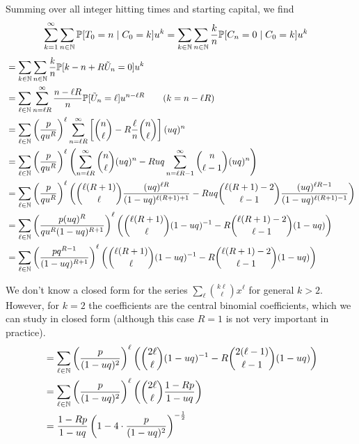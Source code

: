Summing over all integer hitting times and starting capital, we find
\begin{align*}
  \sum_{k=1}^\infty\sum_{n\in\mathbb{N}} \mathbb{P}[T_0 = n\mid C_0=k]u^k &= \sum_{k\in\mathbb{N}}\sum_{n\in\mathbb{N}} \frac{k}{n} \mathbb{P}[C_n = 0\mid C_0=k]u^k 
\end{align*}
\begin{align*}
  &= \sum_{k\in\mathbb{N}}\sum_{n\in\mathbb{N}} \frac{k}{n} \mathbb{P}[k - n + R\tilde{U}_n = 0]u^k \\
  &= \sum_{\ell\in\mathbb{N}}\sum_{n=\ell R}^\infty \frac{n-\ell R}{n} \mathbb{P}[\tilde{U}_n = \ell]u^{n-\ell R}   \qquad (k=n-\ell R)\\
  &= \sum_{\ell\in\mathbb{N}} \left( \frac{p}{qu^R} \right)^\ell \sum_{n=\ell R}^\infty \left[ 
    {n\choose \ell} - R \frac{\ell}{n} {n\choose \ell} 
  \right](uq)^n \\
  &= \sum_{\ell\in\mathbb{N}} \left( \frac{p}{qu^R} \right)^\ell 
  \left( 
    \sum_{n=\ell R}^\infty {n\choose \ell} (uq)^n - 
    Ruq \sum_{n=\ell R - 1}^\infty {n\choose \ell-1} (uq)^n
  \right) \\
  &= \sum_{\ell\in\mathbb{N}} \left( 
    \frac{p}{qu^R} 
  \right)^\ell 
  \left(
    {\ell(R+1) \choose \ell} \frac{ (uq)^{\ell R} } {(1-uq)^{\ell(R+1)+1} } - 
    Ruq {\ell(R+1)-2 \choose \ell - 1} \frac { (uq)^{\ell R-1} } { (1-uq)^{\ell(R+1) -1} }
  \right) \\
  &= \sum_{\ell\in\mathbb{N}} \left( 
    \frac{p(uq)^R}{qu^R(1-uq)^{R+1}} 
  \right)^\ell 
  \left(
    {\ell(R+1) \choose \ell} (1-uq)^{-1} - 
    R {\ell(R+1)-2 \choose \ell - 1} (1-uq)
  \right)  \\
  &= \sum_{\ell\in\mathbb{N}} \left( 
    \frac{pq^{R-1}}{(1-uq)^{R+1}} 
  \right)^\ell 
  \left(
    {\ell(R+1) \choose \ell} (1-uq)^{-1} - 
    R {\ell(R+1)-2 \choose \ell - 1} (1-uq)
  \right)
\end{align*}

We don't know a closed form for the series $\sum_\ell { k\ell \choose \ell }x^\ell $ for general $k>2$.
%
However, for $k=2$ the coefficients are the central binomial coefficients, which we can study in closed form (although this case $R=1$ is not very important in practice).
%
\begin{align*}
  &= \sum_{\ell\in\mathbb{N}} \left( 
    \frac{p}{(1-uq)^{2}} 
  \right)^\ell 
  \left(
    {2\ell \choose \ell} (1-uq)^{-1} - 
    R {2(\ell-1) \choose \ell - 1} (1-uq)
  \right) \\
  &= \sum_{\ell\in\mathbb{N}} \left( 
    \frac{p}{(1-uq)^{2}} 
  \right)^\ell 
  \left(
    {2\ell \choose \ell} \frac{1-Rp}{1-uq}
  \right) \\
  &= \frac{1-Rp}{1-uq}\left(
    1 - 4\cdot \frac{p}{(1-uq)^{2}}
  \right)^{-\frac{1}{2}} 
\end{align*}

